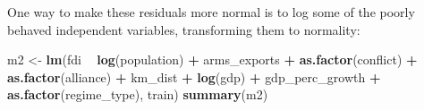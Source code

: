 \documentclass[11pt,]{article}
\newenvironment{Shaded}{\begin{snugshade}}{\end{snugshade}}
\newcommand{\KeywordTok}[1]{\textcolor[rgb]{0.13,0.29,0.53}{\textbf{#1}}}
\newcommand{\NormalTok}[1]{#1}
\newcommand{\OperatorTok}[1]{\textcolor[rgb]{0.81,0.36,0.00}{\textbf{#1}}}
\newcommand{\StringTok}[1]{\textcolor[rgb]{0.31,0.60,0.02}{#1}}
\begin{document}
One way to make these residuals more normal is to log some of the poorly
behaved independent variables, transforming them to normality:

\begin{Shaded}
\begin{Highlighting}[]
\NormalTok{m2 <-}\StringTok{ }\KeywordTok{lm}\NormalTok{(fdi }\OperatorTok{~}\StringTok{ }\KeywordTok{log}\NormalTok{(population) }\OperatorTok{+}\StringTok{ }\NormalTok{arms_exports }\OperatorTok{+}\StringTok{ }\KeywordTok{as.factor}\NormalTok{(conflict) }\OperatorTok{+}\StringTok{ }
\StringTok{               }\KeywordTok{as.factor}\NormalTok{(alliance) }\OperatorTok{+}\StringTok{ }\NormalTok{km_dist }\OperatorTok{+}\StringTok{ }\KeywordTok{log}\NormalTok{(gdp) }\OperatorTok{+}\StringTok{ }\NormalTok{gdp_perc_growth }\OperatorTok{+}
\StringTok{               }\KeywordTok{as.factor}\NormalTok{(regime_type), train)}
\KeywordTok{summary}\NormalTok{(m2)}
\end{Highlighting}
\end{Shaded}
\end{document}
